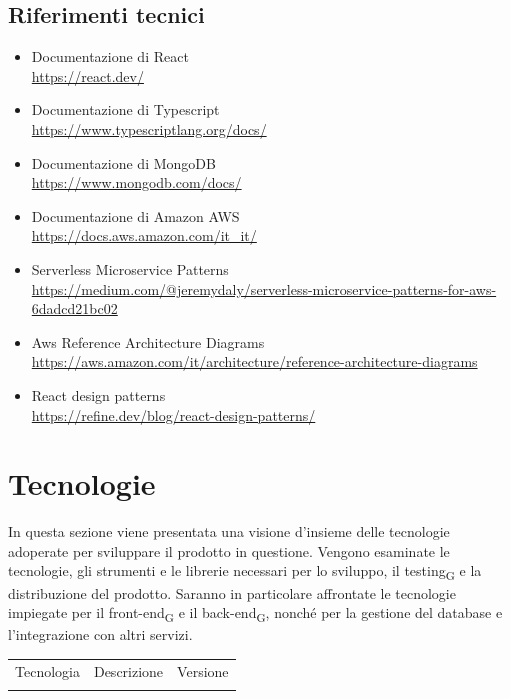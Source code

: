 \documentclass{article}
\begin{document}
{\subsection{Riferimenti tecnici}
\begin{itemize}
\item Documentazione di React \\ \href{ https://react.dev/}{ https://react.dev/}
\item Documentazione di Typescript \\ \href{https://www.typescriptlang.org/docs/}{https://www.typescriptlang.org/docs/}
\item Documentazione di MongoDB \\ \href{https://www.mongodb.com/docs/}{https://www.mongodb.com/docs/}
\item Documentazione di Amazon AWS \\ \href{https://docs.aws.amazon.com/it_it/}{https://docs.aws.amazon.com/it\_it/}
\item Serverless Microservice Patterns \\\href{https://medium.com/@jeremydaly/serverless-microservice-patterns-for-aws-6dadcd21bc02}{https://medium.com/@jeremydaly/serverless-microservice-patterns-for-aws-6dadcd21bc02}
\item Aws Reference Architecture Diagrams \\ \href{https://aws.amazon.com/it/architecture/reference-architecture-diagrams}{https://aws.amazon.com/it/architecture/reference-architecture-diagrams}
\item React design patterns \\ \href{https://refine.dev/blog/react-design-patterns/}{https://refine.dev/blog/react-design-patterns/}
\end{itemize}

\section{Tecnologie}
In questa sezione viene presentata una visione d'insieme delle tecnologie adoperate per sviluppare il prodotto in questione. Vengono esaminate le tecnologie, gli strumenti e le librerie necessari per lo sviluppo, il testing\textsubscript{G} e la distribuzione del prodotto. Saranno in particolare affrontate le tecnologie impiegate per il front-end\textsubscript{G} e il back-end\textsubscript{G}, nonché per la gestione del database e l'integrazione con altri servizi.
\begin{center}
\begin{tabular}{c|c|c}
\hline
\rowcolor{Blue}
Tecnologia & Descrizione & Versione \\
\rowcolor{LighterBlue}


\end{tabular}
\end{center}}
\end{document}
